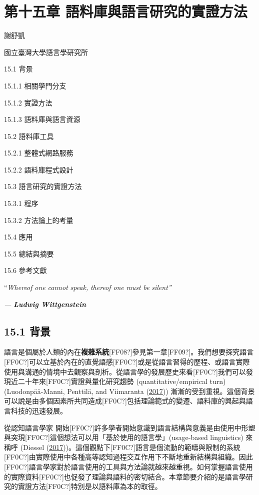 
\section{第十五章  語料庫與語言研究的實證方法}

謝舒凱

國立臺灣大學語言學研究所

15.1 背景

15.1.1 相關學門分支

15.1.2 實證方法

15.1.3 語料庫與語言資源

15.2 語料庫工具

15.2.1 整體式網路服務

15.2.2 語料庫程式設計

15.3 語言研究的實證方法

15.3.1 程序

15.3.2 方法論上的考量

15.4 應用

15.5 總結與摘要

15.6 參考文獻

“\textit{Whereof} \textit{one} \textit{cannot} \textit{speak,} \textit{thereof} \textit{one} \textit{must} \textit{be} \textit{silent”}

\textit{{}---} \textbf{\textit{Ludwig} \textit{Wittgenstein}}

\subsection{15.1 背景}

語言是個屬於人類的內在\textbf{複雜系統}[FF08?]參見第一章[FF09?]。我們想要探究語言[FF0C?]可以立基於內在的直覺語感[FF0C?]或是從語言習得的歷程、或語言實際使用與溝通的情境中去觀察與剖析。從語言學的發展歷史來看[FF0C?]我們可以發現近二十年來[FF0C?]實證與量化研究趨勢 (quantitative/empirical turn) (Luodonpää-Manni, Penttilä, and Viimaranta (\hyperlink{bookmarkid28h4qwu}{2017})) 漸漸的受到重視。這個背景可以說是由多個因素所共同造成[FF0C?]包括理論範式的變遷、語料庫的興起與語言科技的迅速發展。

從認知語言學家 \citet{Langacker1987} 開始[FF0C?]許多學者開始意識到語言結構與意義是由使用中形塑與突現[FF0C?]這個想法可以用「基於使用的語言學」(usage-based linguistics) 來稱呼 (Diessel (\hyperlink{bookmarkid2grqrue}{2017}))。這個觀點下[FF0C?]語言是個流動的範疇與限制的系統[FF0C?]由實際使用中各種高等認知過程交互作用下不斷地重新結構與組織。因此[FF0C?]語言學家對於語言使用的工具與方法論就越來越重視。如何掌握語言使用的實際資料[FF0C?]也促發了理論與語料的密切結合。本章節要介紹的是語言學研究的實證方法[FF0C?]特別是以語料庫為本的取徑。

